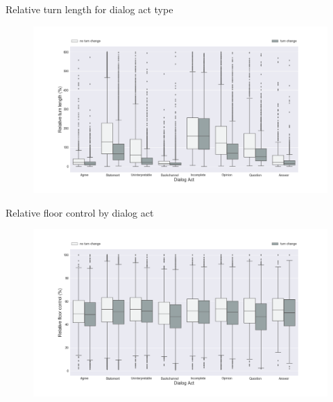 \begin{frame}{Relative turn length for dialog act type}
\begin{figure}[ht!]
\centering
\includegraphics[width=36em]{../scikitlearn/figures/f3.png}\vspace{-1em}
\end{figure}
\end{frame}


\begin{frame}{Relative floor control by dialog act}
\begin{figure}[ht!]
\centering
\includegraphics[width=36em]{../scikitlearn/figures/f4.png}\vspace{-1em}
\end{figure}
\end{frame}
